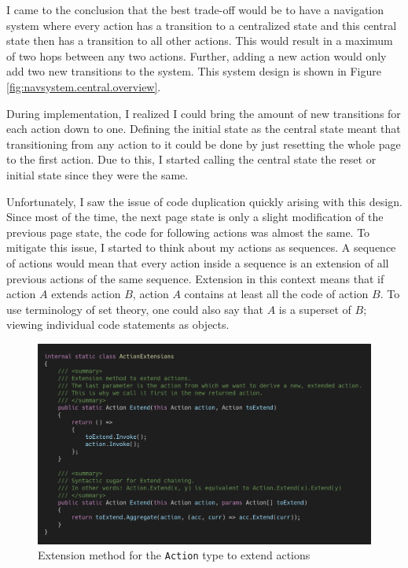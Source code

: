 I came to the conclusion that the best trade-off would be to have a navigation system where every action has a transition to a centralized state and this central state then has a transition to all other actions. This would result in a maximum of two hops between any two actions. Further, adding a new action would only add two new transitions to the system. This system design is shown in Figure \ref{fig:navsystem.central.overview}.

During implementation, I realized I could bring the amount of new transitions for each action down to one. Defining the initial state as the central state meant that transitioning from any action to it could be done by just resetting the whole page to the first action. Due to this, I started calling the central state the reset or initial state since they were the same.

Unfortunately, I saw the issue of code duplication quickly arising with this design. Since most of the time, the next page state is only a slight modification of the previous page state, the code for following actions was almost the same. To mitigate this issue, I started to think about my actions as sequences. A sequence of actions would mean that every action inside a sequence is an extension of all previous actions of the same sequence. Extension in this context means that if action $A$ extends action $B$, action $A$ contains at least all the code of action $B$. To use terminology of set theory, one could also say that $A$ is a superset of $B$; viewing individual code statements as objects.

\begin{figure}
\centering
\includegraphics[width=\textwidth]{figures/code/nav-arch/action-extensions.png}
\caption[Extending \texttt{Action} type]{Extension method for the \texttt{Action} type to extend actions}
\label{fig:navsystem.sequences.extension}
\end{figure}

